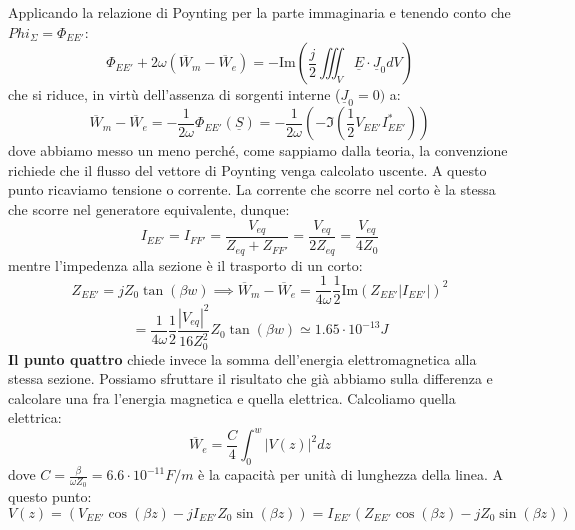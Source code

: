 \documentclass{book}
\begin{document}
        Applicando la relazione di Poynting per la parte immaginaria e tenendo conto che $Phi_{\Sigma} = \Phi_{EE'}$:
        \begin{equation}
            \Phi_{EE'}+2 \omega (\overline{W}_{m}-\overline{W}_{e})=-\textrm{Im}(\frac{j}{2} \iiint_{V} \underline{E} \cdot \underline{J}_{0}dV)
        \end{equation}
        che si riduce, in virtù dell'assenza di sorgenti interne ($\underline{J}_{0}=0)$ a:
        \begin{equation}
            \overline{W}_{m}-\overline{W}_{e} = -\frac{1}{2\omega}\Phi_{EE'}(\underline{S}) = -\frac{1}{2\omega} (-\Im(\frac{1}{2}V_{EE'}I_{EE'} ^{*}))
        \end{equation}
        dove abbiamo messo un meno perché, come sappiamo dalla teoria, la convenzione richiede che il flusso del vettore di Poynting venga calcolato uscente.
        A questo punto ricaviamo tensione o corrente. La corrente che scorre nel corto è la stessa che scorre nel generatore equivalente, dunque:
        \begin{equation}
            I_{EE'} = I_{FF'} = \frac{V_{eq}}{Z_{eq}+Z_{FF'}} = \frac{V_{eq}}{2Z_{eq}} = \frac{V_{eq}}{4Z_{0}}
        \end{equation}
        mentre l'impedenza alla sezione è il trasporto di un corto:
        \begin{equation}
            Z_{EE'}=jZ_{0}\tan(\beta w) \implies \overline{W}_{m}-\overline{W}_{e} = \frac{1}{4 \omega}\frac{1}{2}\textrm{Im}(Z_{EE'}|I_{EE'}|) ^{2}
        \end{equation}
        \begin{equation}
            = \frac{1}{4 \omega} \frac{1}{2}\frac{|V_{eq} |^{2}}{16Z_{0} ^{2}} Z_{0}\tan(\beta w) \simeq 1.65 \cdot 10^{-13}J
        \end{equation}
        \textbf{Il punto quattro} chiede invece la somma dell'energia elettromagnetica alla stessa sezione. Possiamo sfruttare il risultato che già abbiamo sulla differenza 
        e calcolare una fra l'energia magnetica e quella elettrica. Calcoliamo quella elettrica:
        \begin{equation}
            \overline{W}_{e} = \frac{C}{4} \int_{0} ^{w} |V(z)|^{2}dz
        \end{equation}
        dove $C=\displaystyle \frac{\beta}{\omega Z_{0}} = 6.6 \cdot 10^{-11} F/m$ è la capacità per unità di lunghezza della linea.
        A questo punto:
        \begin{equation}
            V(z) = (V_{EE'}\cos(\beta z)-jI_{EE'}Z_{0}\sin(\beta z)) = I_{EE'}(Z_{EE'}\cos(\beta z)-jZ_{0}\sin(\beta z)) 
        \end{equation}
\end{document}
